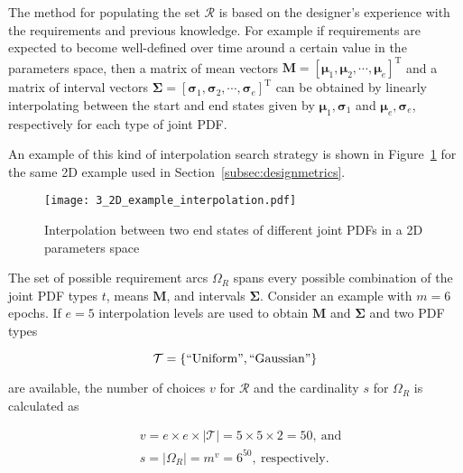 The method for populating the set $\mathcal{R}$ is based on the designer's experience with the requirements and previous knowledge. For example if requirements are expected to become well-defined over time around a certain value in the parameters space, then a matrix of mean vectors $\mathbf{M} = \left[\boldsymbol{\mu}_1,\boldsymbol{\mu}_2,\cdots,\boldsymbol{\mu}_e\right]^{\textrm{T}}$ and a matrix of interval vectors $\boldsymbol{\Sigma} = \left[\boldsymbol{\sigma}_1,\boldsymbol{\sigma}_2,\cdots,\boldsymbol{\sigma}_e\right]^{\textrm{T}}$ can be obtained by linearly interpolating between the start and end states given by $\boldsymbol{\mu}_1,\boldsymbol{\sigma}_1$ and $\boldsymbol{\mu}_e,\boldsymbol{\sigma}_e$, respectively for each type of joint \ac{PDF}. 

An example of this kind of interpolation search strategy is shown in Figure~\ref{fig:2Dexampleinterp} for the same 2D example used in Section~\ref{subsec:designmetrics}.

\begin{figure}[h!]
	\centering
	\texttt{[image: 3\_2D\_example\_interpolation.pdf]}
	\caption{Interpolation between two end states of different joint \acp{PDF} in a 2D parameters space}
	\label{fig:2Dexampleinterp}
\end{figure}

The set of possible requirement arcs $\Omega_R$ spans every possible combination of the joint \ac{PDF} types $t$, means $\mathbf{M}$, and intervals $\boldsymbol{\Sigma}$. Consider an example with $m=6$ epochs. If $e=5$ interpolation levels are used to obtain $\mathbf{M}$ and $\boldsymbol{\Sigma}$ and two \ac{PDF} types 

\begin{equation*}
	\mathcal{T} = \left\{\mathrm{``Uniform"},\mathrm{``Gaussian"}\right\}
\end{equation*} 

are available, the number of choices $v$ for $\mathcal{R}$ and the cardinality $s$ for $\Omega_R$ is calculated as

\begin{equation*}
	\begin{aligned}
		& v = e \times e \times |\mathcal{T}| = 5 \times 5 \times 2 = 50,~\textrm{and}\\
		& s = |\Omega_R| = m^v = 6^{50},~\mathrm{respectively}.\\
	\end{aligned}
\end{equation*}

